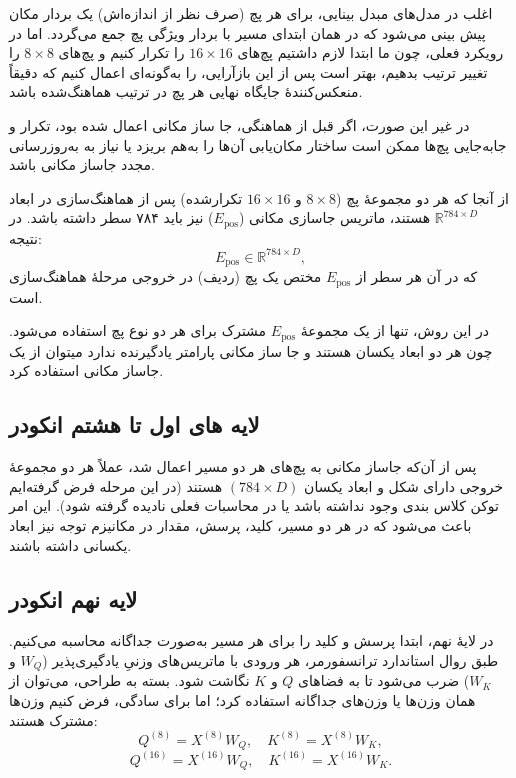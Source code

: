 اغلب در مدل‌های مبدل بینایی، برای هر پچ (صرف‌ نظر از اندازه‌اش) یک بردار مکان  پیش ‌بینی می‌شود که در همان ابتدای مسیر با بردار ویژگی پچ جمع می‌گردد. اما در رویکرد فعلی، چون ما ابتدا لازم داشتیم پچ‌های $16 \times 16$ را تکرار کنیم و پچ‌های $8 \times 8$ را تغییر ترتیب بدهیم، بهتر است پس از این بازآرایی، را به‌گونه‌ای اعمال کنیم که دقیقاً منعکس‌کنندهٔ جایگاه نهایی هر پچ در ترتیب هماهنگ‌شده باشد. 

در غیر این صورت، اگر قبل از هماهنگی، جا ساز مکانی اعمال شده بود، تکرار و جابه‌جایی پچ‌ها ممکن است ساختار مکان‌یابی آن‌ها را به‌هم بریزد یا نیاز به به‌روزرسانی مجدد جاساز مکانی باشد.

از آنجا که هر دو مجموعهٔ پچ ($8 \times 8$ و $16 \times 16$ تکرارشده) پس از هماهنگ‌سازی در ابعاد 
\(\mathbb{R}^{784 \times D}\)
هستند، ماتریس جاسازی مکانی (\(E_{\text{pos}}\)) نیز باید ۷۸۴ سطر داشته باشد. در نتیجه:
\[
E_{\text{pos}} \in \mathbb{R}^{784 \times D},
\]
که در آن هر سطر از \(E_{\text{pos}}\) مختص یک پچ (ردیف) در خروجی مرحلهٔ هماهنگ‌سازی است.

در این روش، تنها از یک مجموعهٔ \(E_{\text{pos}}\) مشترک برای هر دو نوع پچ استفاده می‌شود. چون هر دو ابعاد یکسان هستند و جا ساز مکانی  پارامتر یادگیرنده ندارد میتوان از یک جاساز مکانی استفاده کرد.

\subsection{لایه های اول تا هشتم انکودر}

پس از آن‌که جاساز مکانی به پچ‌های هر دو مسیر اعمال شد، عملاً هر دو مجموعهٔ خروجی دارای شکل و ابعاد یکسان \((784 \times D)\) هستند (در این مرحله فرض گرفته‌ایم توکن کلاس بندی وجود نداشته باشد یا در محاسبات فعلی نادیده گرفته شود). این امر باعث می‌شود که در هر دو مسیر، کلید، پرسش، مقدار در مکانیزم توجه نیز ابعاد یکسانی داشته باشند.

\subsection{لایه نهم انکودر}

در لایهٔ نهم، ابتدا پرسش و کلید  را برای هر مسیر به‌صورت جداگانه محاسبه می‌کنیم. طبق روال استاندارد ترانسفورمر، هر ورودی با ماتریس‌های وزنیِ یادگیری‌پذیر (\(W_Q\) و \(W_K\)) ضرب می‌شود تا به فضاهای \(Q\) و \(K\) نگاشت شود. بسته به طراحی، می‌توان از همان وزن‌ها یا وزن‌های جداگانه استفاده کرد؛ اما برای سادگی، فرض کنیم وزن‌ها مشترک هستند:
\[
Q^{(8)} = X^{(8)} W_Q, \quad K^{(8)} = X^{(8)} W_K,
\]
\[
Q^{(16)} = X^{(16)} W_Q, \quad K^{(16)} = X^{(16)} W_K.
\]

